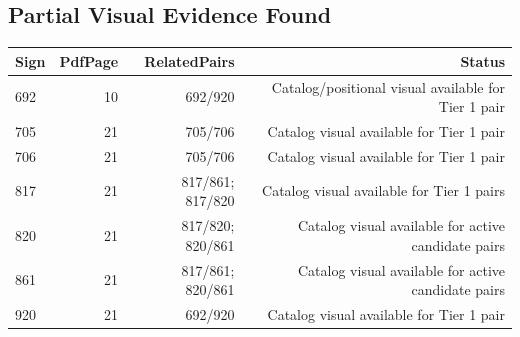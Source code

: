 ﻿\documentclass[11pt,a4paper]{article}
\begin{document}
\subsection*{Partial Visual Evidence Found}
\begin{center}
\begin{tabular}{lrrr}
\toprule
\textbf{Sign} & \textbf{PdfPage} & \textbf{RelatedPairs} & \textbf{Status} \\
\midrule
692 & 10 & 692/920 & Catalog/positional visual available for Tier 1 pair \\
705 & 21 & 705/706 & Catalog visual available for Tier 1 pair \\
706 & 21 & 705/706 & Catalog visual available for Tier 1 pair \\
817 & 21 & 817/861; 817/820 & Catalog visual available for Tier 1 pairs \\
820 & 21 & 817/820; 820/861 & Catalog visual available for active candidate pairs \\
861 & 21 & 817/861; 820/861 & Catalog visual available for active candidate pairs \\
920 & 21 & 692/920 & Catalog visual available for Tier 1 pair \\
\bottomrule
\end{tabular}
\end{center}
\end{document}

